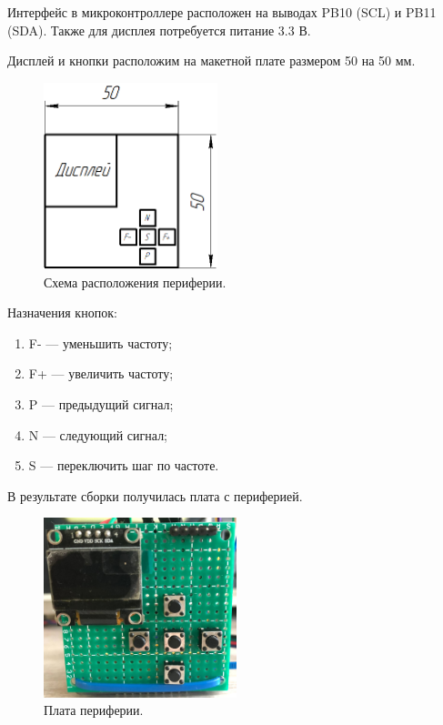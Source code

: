 	Интерфейс в микроконтроллере расположен на выводах PB10 (SCL) и PB11 (SDA). Также для дисплея потребуется питание 3.3 В.
	
	Дисплей и кнопки расположим на макетной плате размером 50 на 50 мм.
	
	\begin{figure}[H]
    \centering
    \includegraphics[width=0.45\textwidth]{../image/func_gen.png}
    \caption{Схема расположения периферии.}
	\end{figure}
	
	Назначения кнопок:
	\begin{enumerate}
	\item F- --- уменьшить частоту;
	\item F+ --- увеличить частоту;
	\item P --- предыдущий сигнал;
	\item N --- следующий сигнал;
	\item S --- переключить шаг по частоте.
	\end{enumerate}
	
	В результате сборки получилась плата с периферией.

	\begin{figure}[H]
    \centering
    \includegraphics[width=0.5\textwidth]{../image/m1.jpeg}
    \caption{Плата периферии.}
	\end{figure}	
	

